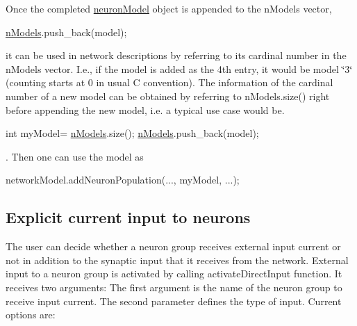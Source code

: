 Once the completed {\ttfamily \hyperlink{structneuronModel}{neuron\+Model}} object is appended to the {\ttfamily n\+Models} vector, 
\begin{DoxyCode}
\hyperlink{utils_8h_a2bd39d11c2cd6cec9bf9b81c183b6cd4}{nModels}.push\_back(model);
\end{DoxyCode}
 it can be used in network descriptions by referring to its cardinal number in the n\+Models vector. I.\+e., if the model is added as the 4th entry, it would be model \char`\"{}3\char`\"{} (counting starts at 0 in usual C convention). The information of the cardinal number of a new model can be obtained by referring to {\ttfamily n\+Models.\+size()} right before appending the new model, i.\+e. a typical use case would be. 
\begin{DoxyCode}
\textcolor{keywordtype}{int} myModel= \hyperlink{utils_8h_a2bd39d11c2cd6cec9bf9b81c183b6cd4}{nModels}.size();
\hyperlink{utils_8h_a2bd39d11c2cd6cec9bf9b81c183b6cd4}{nModels}.push\_back(model);
\end{DoxyCode}
. Then one can use the model as 
\begin{DoxyCode}
networkModel.addNeuronPopulation(..., myModel, ...);
\end{DoxyCode}
\hypertarget{sect2_sect_explinput}{}\subsection{Explicit current input to neurons}\label{sect2_sect_explinput}
The user can decide whether a neuron group receives external input current or not in addition to the synaptic input that it receives from the network. External input to a neuron group is activated by calling {\ttfamily activate\+Direct\+Input} function. It receives two arguments\+: The first argument is the name of the neuron group to receive input current. The second parameter defines the type of input. Current options are\+:


